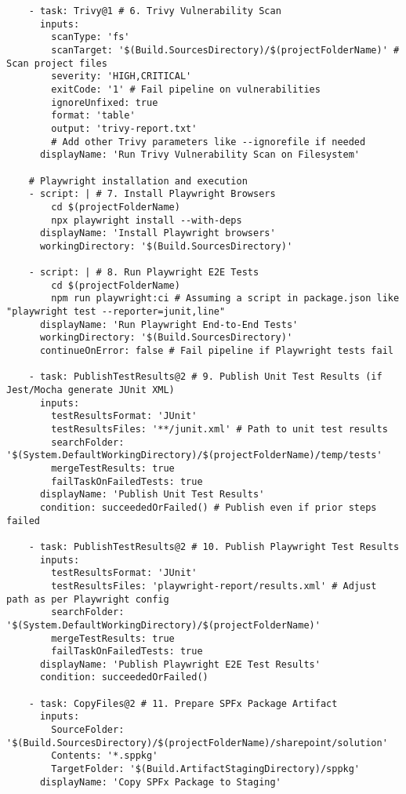 \begin{framed}
\begin{verbatim}
    - task: Trivy@1 # 6. Trivy Vulnerability Scan
      inputs:
        scanType: 'fs'
        scanTarget: '$(Build.SourcesDirectory)/$(projectFolderName)' # Scan project files
        severity: 'HIGH,CRITICAL'
        exitCode: '1' # Fail pipeline on vulnerabilities
        ignoreUnfixed: true
        format: 'table'
        output: 'trivy-report.txt'
        # Add other Trivy parameters like --ignorefile if needed
      displayName: 'Run Trivy Vulnerability Scan on Filesystem'

    # Playwright installation and execution
    - script: | # 7. Install Playwright Browsers
        cd $(projectFolderName)
        npx playwright install --with-deps
      displayName: 'Install Playwright browsers'
      workingDirectory: '$(Build.SourcesDirectory)'

    - script: | # 8. Run Playwright E2E Tests
        cd $(projectFolderName)
        npm run playwright:ci # Assuming a script in package.json like "playwright test --reporter=junit,line"
      displayName: 'Run Playwright End-to-End Tests'
      workingDirectory: '$(Build.SourcesDirectory)'
      continueOnError: false # Fail pipeline if Playwright tests fail

    - task: PublishTestResults@2 # 9. Publish Unit Test Results (if Jest/Mocha generate JUnit XML)
      inputs:
        testResultsFormat: 'JUnit'
        testResultsFiles: '**/junit.xml' # Path to unit test results
        searchFolder: '$(System.DefaultWorkingDirectory)/$(projectFolderName)/temp/tests'
        mergeTestResults: true
        failTaskOnFailedTests: true
      displayName: 'Publish Unit Test Results'
      condition: succeededOrFailed() # Publish even if prior steps failed

    - task: PublishTestResults@2 # 10. Publish Playwright Test Results
      inputs:
        testResultsFormat: 'JUnit'
        testResultsFiles: 'playwright-report/results.xml' # Adjust path as per Playwright config
        searchFolder: '$(System.DefaultWorkingDirectory)/$(projectFolderName)'
        mergeTestResults: true
        failTaskOnFailedTests: true
      displayName: 'Publish Playwright E2E Test Results'
      condition: succeededOrFailed()

    - task: CopyFiles@2 # 11. Prepare SPFx Package Artifact
      inputs:
        SourceFolder: '$(Build.SourcesDirectory)/$(projectFolderName)/sharepoint/solution'
        Contents: '*.sppkg'
        TargetFolder: '$(Build.ArtifactStagingDirectory)/sppkg'
      displayName: 'Copy SPFx Package to Staging'


\end{verbatim}
\end{framed}
